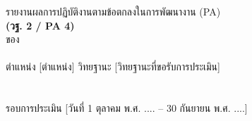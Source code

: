 \thispagestyle{empty}
\begin{center}
\vspace*{2.5cm}
{\hOneSize รายงานผลการปฏิบัติงานตามข้อตกลงในการพัฒนางาน (PA)}\\[6pt]
{\Large\bfseries (วฐ. 2 / PA 4)}\\[3.5cm]

{\bodysize ของ}\\[1.2cm]
{}\\[6pt]
{\bodysize ตำแหน่ง [ตำแหน่ง] วิทยฐานะ [วิทยฐานะที่ขอรับการประเมิน]}\\[4cm]

{}\\
{}\\
{\bodysize รอบการประเมิน [วันที่ 1 ตุลาคม พ.ศ. .... -- 30 กันยายน พ.ศ. ....]}
\end{center}
